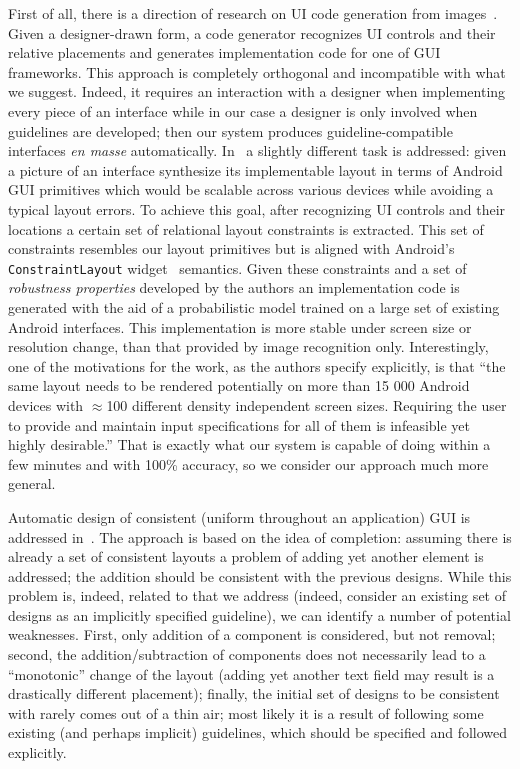 First of all, there is a direction of research on UI code generation from images~\cite{Cai2023}. Given a designer-drawn form, a code
generator recognizes UI controls and their relative placements and generates implementation code for one of GUI frameworks. This approach
is completely orthogonal and incompatible with what we suggest. Indeed, it requires an interaction with a designer when implementing every piece of
an interface while in our case a designer is only involved when guidelines are developed; then our system produces guideline-compatible
interfaces \emph{en masse} automatically. In~\cite{Robust} a slightly different task is addressed: given a picture of an interface synthesize its
implementable layout in terms of Android GUI primitives which would be scalable across various devices while avoiding a typical layout errors.
To achieve this goal, after recognizing UI controls and their locations a certain set of relational layout constraints is extracted. This
set of constraints resembles our layout primitives but is aligned with Android's \texttt{ConstraintLayout} widget~\cite{ConstraintLayout} semantics.
Given these constraints and a set of \emph{robustness properties} developed by the authors an implementation code is generated with
the aid of a probabilistic model trained on a large set of existing Android interfaces. This implementation is more stable under screen size
or resolution change, than that provided by image recognition only. Interestingly, one of the motivations for the work, as the authors
specify explicitly, is that ``the same layout needs to be rendered potentially on more than 15 000 Android devices with $\approx$100 different density
independent screen sizes. Requiring the user to provide and maintain input specifications for all of them is infeasible yet highly desirable.''
That is exactly what our system is capable of doing within a few minutes and with 100\% accuracy, so we consider our approach
much more general.

Automatic design of consistent (uniform throughout an application) GUI is addressed in~\cite{LearningGUI}. The approach is based on the idea of completion:
assuming there is already a set of consistent layouts a problem of adding yet another element is addressed; the addition should be consistent with the previous
designs. While this problem is, indeed, related to that we address (indeed, consider an existing set of designs as an implicitly specified guideline),
we can identify a number of potential weaknesses. First, only addition of a component is considered, but not removal; second, the addition/subtraction
of components does not necessarily lead to a ``monotonic'' change of the layout (adding yet another text field may result is a drastically different placement);
finally, the initial set of designs to be consistent with rarely comes out of a thin air; most likely it is a result of following some
existing (and perhaps implicit) guidelines, which should be specified and followed explicitly.

